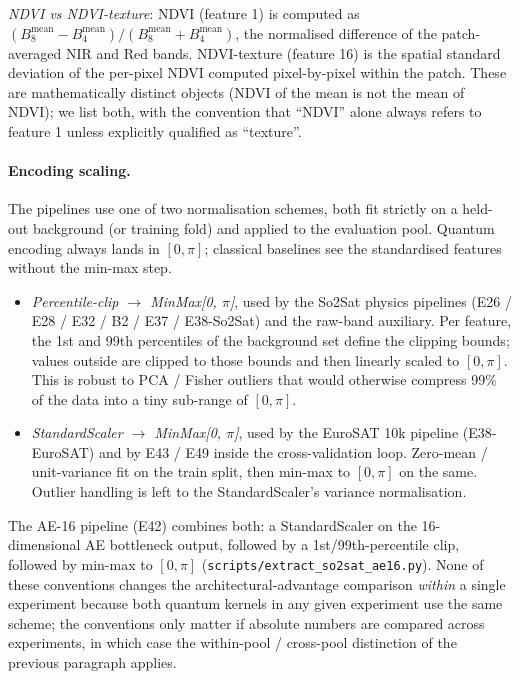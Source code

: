 \documentclass[pdflatex,sn-mathphys]{sn-jnl}
\theoremstyle{plain}
\theoremstyle{remark}
\theoremstyle{definition}
\begin{document}
\noindent\emph{NDVI vs NDVI-texture}: NDVI (feature 1) is computed as $(B_8^\text{mean} - B_4^\text{mean})/(B_8^\text{mean} + B_4^\text{mean})$, the normalised difference of the patch-averaged NIR and Red bands.  NDVI-texture (feature 16) is the spatial standard deviation of the per-pixel NDVI computed pixel-by-pixel within the patch.  These are mathematically distinct objects (NDVI of the mean is not the mean of NDVI); we list both, with the convention that ``NDVI'' alone always refers to feature 1 unless explicitly qualified as ``texture''.

\paragraph{Encoding scaling.}
The pipelines use one of two normalisation schemes, both fit strictly on a held-out background (or training fold) and applied to the evaluation pool.  Quantum encoding always lands in $[0, \pi]$; classical baselines see the standardised features without the min-max step.

\begin{itemize}
\item[(P)] \emph{Percentile-clip $\to$ MinMax[0, $\pi$]}, used by the So2Sat physics pipelines (E26 / E28 / E32 / B2 / E37 / E38-So2Sat) and the raw-band auxiliary.  Per feature, the 1st and 99th percentiles of the background set define the clipping bounds; values outside are clipped to those bounds and then linearly scaled to $[0, \pi]$.  This is robust to PCA / Fisher outliers that would otherwise compress 99\% of the data into a tiny sub-range of $[0, \pi]$.
\item[(S)] \emph{StandardScaler $\to$ MinMax[0, $\pi$]}, used by the EuroSAT 10k pipeline (E38-EuroSAT) and by E43 / E49 inside the cross-validation loop.  Zero-mean / unit-variance fit on the train split, then min-max to $[0, \pi]$ on the same.  Outlier handling is left to the StandardScaler's variance normalisation.
\end{itemize}

The AE-16 pipeline (E42) combines both: a StandardScaler on the 16-dimensional AE bottleneck output, followed by a 1st/99th-percentile clip, followed by min-max to $[0, \pi]$ (\texttt{scripts/extract\_so2sat\_ae16.py}).  None of these conventions changes the architectural-advantage comparison \emph{within} a single experiment because both quantum kernels in any given experiment use the same scheme; the conventions only matter if absolute numbers are compared across experiments, in which case the within-pool / cross-pool distinction of the previous paragraph applies.
\end{document}
